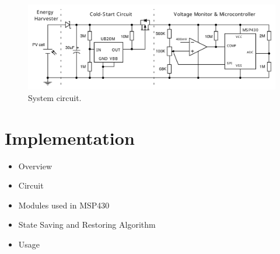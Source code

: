 \begin{figure}[!t]
    \centering
    \includegraphics[width=7in]{ch5_repta/figures/circuit.pdf}
    \caption{System circuit. }
    \label{fig:schematic}
\end{figure}

\newpage
\section{Implementation}

\begin{itemize}
    \item Overview
    \item Circuit
    \item Modules used in MSP430 
    \item State Saving and Restoring Algorithm
    \item Usage
\end{itemize}


